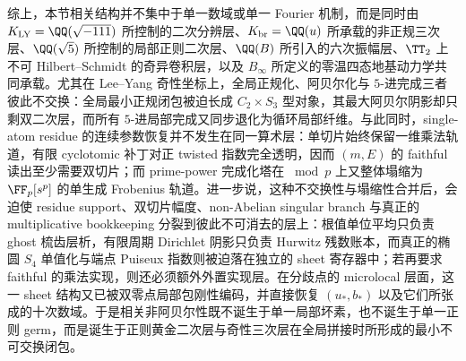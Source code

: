 





综上，本节相关结构并不集中于单一数域或单一 Fourier 机制，而是同时由 \(K_{\mathrm{LY}}=\QQ(\sqrt{-111})\) 所控制的二次分辨层、\(K_{\mathrm{br}}=\QQ(u)\) 所承载的非正规三次层、\(\QQ(\sqrt5)\) 所控制的局部正则二次层、\(\QQ(B)\) 所引入的六次振幅层、\(\TT_2\) 上不可 Hilbert--Schmidt 的奇异卷积层，以及 \(B_\infty\) 所定义的零温四态地基动力学共同承载。尤其在 Lee--Yang 奇性坐标上，全局正规化、阿贝尔化与 \(5\)-进完成三者彼此不交换：全局最小正规闭包被迫长成 \(C_2\times S_3\) 型对象，其最大阿贝尔阴影却只剩双二次层，而所有 \(5\)-进局部完成又同步退化为循环局部纤维。与此同时，single-atom residue 的连续参数恢复并不发生在同一算术层：单切片始终保留一维乘法轨道，有限 cyclotomic 补丁对正 twisted 指数完全透明，因而 \((m,E)\) 的 faithful 读出至少需要双切片；而 prime-power 完成化塔在 \(\bmod p\) 上又整体塌缩为 \(\FF_p[s^p]\) 的单生成 Frobenius 轨道。进一步说，这种不交换性与塌缩性合并后，会迫使 residue support、双切片幅度、non-Abelian singular branch 与真正的 multiplicative bookkeeping 分裂到彼此不可消去的层上：根值单位平均只负责 ghost 梳齿层析，有限周期 Dirichlet 阴影只负责 Hurwitz 残数账本，而真正的椭圆 \(S_4\) 单值化与端点 Puiseux 指数则被迫落在独立的 sheet 寄存器中；若再要求 faithful 的乘法实现，则还必须额外外置实现层。在分歧点的 microlocal 层面，这一 sheet 结构又已被双零点局部包刚性编码，并直接恢复 \((u_\ast,b_\ast)\) 以及它们所张成的十次数域。于是相关非阿贝尔性既不诞生于单一局部坏素，也不诞生于单一正则 germ，而是诞生于正则黄金二次层与奇性三次层在全局拼接时所形成的最小不可交换闭包。

\endinput
